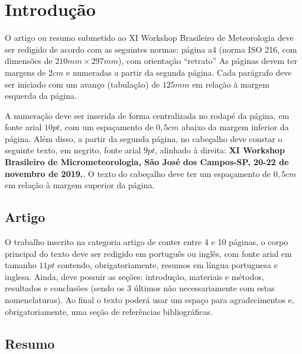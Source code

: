 \documentclass[]{workmicro2019} %
\affil[1]{Curso de Graduação em Meteorologia, UFPEL}
\affil[2]{Curso de Graduação em Meteorologia, UFSC}
\affil[3]{Curso Técnico em Meteorologia, IFSC}
\affil[4]{Departamento de Física, UFSM}
\begin{document}

\corpo  %


\section{Introdução}

\par O artigo ou resumo submetido ao XI Workshop Brasileiro de Meteorologia deve ser redigido de acordo com as seguintes normas: página a4 (norma ISO 216, com dimensões de $210mm\times297mm$), com orientação ``retrato'' As páginas devem ter margens de $2cm$ e numeradas a partir da segunda página. Cada parágrafo deve ser iniciado com um avanço (tabulação) de $125mm$ em relação à margem esquerda da página.

\par A numeração deve ser inserida de forma centralizada no rodapé da página, em fonte arial $10pt$, com um espaçamento de $0,5cm$ abaixo da margem inferior da página. Além disso, a partir da segunda página, no cabeçalho deve constar o seguinte texto, em negrito, fonte arial $9pt$, alinhado à direita: \textbf{XI Workshop Brasileiro de Micrometeorologia, São José dos Campos-SP, 20-22 de novembro de 2019.}. O texto do cabeçalho deve ter um espaçamento de $0,5cm$ em relação à margem superior da página.

\subsection{Artigo}

\par O trabalho inscrito na categoria artigo de conter entre 4 e 10 páginas, o corpo principal do texto deve ser redigido em português ou inglês, com fonte arial em tamanho $11pt$ contendo, obrigatoriamente, resumos em língua portuguesa e inglesa. Ainda, deve possuir as seções: introdução, materiais e métodos, resultados e conclusões (sendo os 3 últimos não necessariamente com estas nomenclaturas). Ao final o texto poderá usar um espaço para agradecimentos e, obrigatoriamente, uma seção de referências bibliográficas.

\subsection{Resumo}
\end{document}
